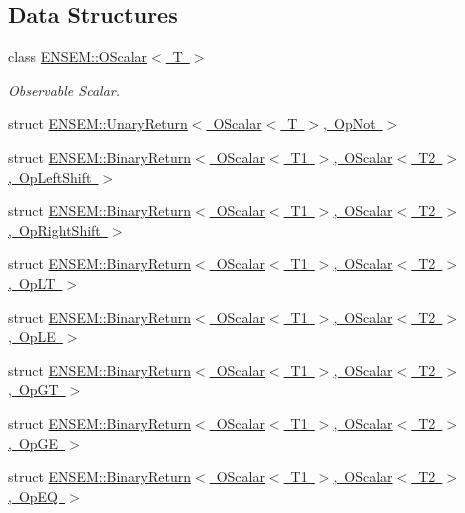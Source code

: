 \subsection*{Data Structures}
\begin{DoxyCompactItemize}
\item 
class \mbox{\hyperlink{classENSEM_1_1OScalar}{E\+N\+S\+E\+M\+::\+O\+Scalar$<$ T $>$}}
\begin{DoxyCompactList}\small\item\em Observable Scalar. \end{DoxyCompactList}\item 
struct \mbox{\hyperlink{structENSEM_1_1UnaryReturn_3_01OScalar_3_01T_01_4_00_01OpNot_01_4}{E\+N\+S\+E\+M\+::\+Unary\+Return$<$ O\+Scalar$<$ T $>$, Op\+Not $>$}}
\item 
struct \mbox{\hyperlink{structENSEM_1_1BinaryReturn_3_01OScalar_3_01T1_01_4_00_01OScalar_3_01T2_01_4_00_01OpLeftShift_01_4}{E\+N\+S\+E\+M\+::\+Binary\+Return$<$ O\+Scalar$<$ T1 $>$, O\+Scalar$<$ T2 $>$, Op\+Left\+Shift $>$}}
\item 
struct \mbox{\hyperlink{structENSEM_1_1BinaryReturn_3_01OScalar_3_01T1_01_4_00_01OScalar_3_01T2_01_4_00_01OpRightShift_01_4}{E\+N\+S\+E\+M\+::\+Binary\+Return$<$ O\+Scalar$<$ T1 $>$, O\+Scalar$<$ T2 $>$, Op\+Right\+Shift $>$}}
\item 
struct \mbox{\hyperlink{structENSEM_1_1BinaryReturn_3_01OScalar_3_01T1_01_4_00_01OScalar_3_01T2_01_4_00_01OpLT_01_4}{E\+N\+S\+E\+M\+::\+Binary\+Return$<$ O\+Scalar$<$ T1 $>$, O\+Scalar$<$ T2 $>$, Op\+L\+T $>$}}
\item 
struct \mbox{\hyperlink{structENSEM_1_1BinaryReturn_3_01OScalar_3_01T1_01_4_00_01OScalar_3_01T2_01_4_00_01OpLE_01_4}{E\+N\+S\+E\+M\+::\+Binary\+Return$<$ O\+Scalar$<$ T1 $>$, O\+Scalar$<$ T2 $>$, Op\+L\+E $>$}}
\item 
struct \mbox{\hyperlink{structENSEM_1_1BinaryReturn_3_01OScalar_3_01T1_01_4_00_01OScalar_3_01T2_01_4_00_01OpGT_01_4}{E\+N\+S\+E\+M\+::\+Binary\+Return$<$ O\+Scalar$<$ T1 $>$, O\+Scalar$<$ T2 $>$, Op\+G\+T $>$}}
\item 
struct \mbox{\hyperlink{structENSEM_1_1BinaryReturn_3_01OScalar_3_01T1_01_4_00_01OScalar_3_01T2_01_4_00_01OpGE_01_4}{E\+N\+S\+E\+M\+::\+Binary\+Return$<$ O\+Scalar$<$ T1 $>$, O\+Scalar$<$ T2 $>$, Op\+G\+E $>$}}
\item 
struct \mbox{\hyperlink{structENSEM_1_1BinaryReturn_3_01OScalar_3_01T1_01_4_00_01OScalar_3_01T2_01_4_00_01OpEQ_01_4}{E\+N\+S\+E\+M\+::\+Binary\+Return$<$ O\+Scalar$<$ T1 $>$, O\+Scalar$<$ T2 $>$, Op\+E\+Q $>$}}

\end{DoxyCompactItemize}
